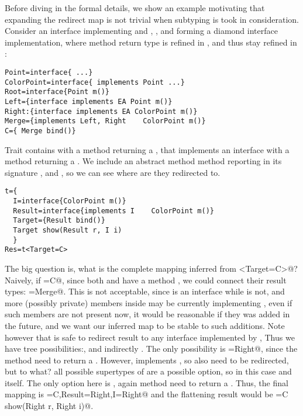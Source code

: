 Before diving in the formal details, we show an example motivating 
that expanding the redirect map is not trivial when subtyping is took in consideration.
Consider an interface \Q@ColorPoint@ implementing \Q@Point@
and \Q@Root@, \Q@Left@, \Q@Right@ and \Q@Merge@
forming a diamond interface implementation, where method 
\Q@m@ return type is refined in \Q@Right@, and thus stay refined in
\Q@Merge@:
\begin{lstlisting}
Point=interface{ ...}
ColorPoint=interface{ implements Point ...}
Root=interface{Point m()}
Left={interface implements EA Point m()}
Right:{interface implements EA ColorPoint m()}
Merge={implements Left, Right    ColorPoint m()}
C={ Merge bind()}
\end{lstlisting}
Trait \Q@t@ contains
 \Q@Target@ with a method returning a \Q@Result@,
that implements an interface \Q@I@ with a method returning a 
\Q@ColorPoint@.
We include an abstract method method 
\Q@show@ reporting in its signature 
\Q@Target@, \Q@Result@ and \Q@I@, so we can see where are they
redirected to.
\begin{lstlisting}
t={
  I=interface{ColorPoint m()}
  Result=interface{implements I    ColorPoint m()}
  Target={Result bind()}
  Target show(Result r, I i)
  }
Res=t<Target=C>
\end{lstlisting}
The big question is, what is the complete mapping inferred
from \Q@t<Target=C>@?
Naively, if \Q@Target=C@, since both \Q@Target@ and \Q@C@
have a method \Q@bind@, we could connect their result types: \Q@Result=Merge@.
This is not acceptable, since \Q@Result@ is an interface while \Q@Merge@ is not, and more (possibly private)
members inside \Q@t@ may be currently implementing \Q@Result@, even if such members are not present now,
it would be reasonable if they was added in the future, and we want our inferred map to be stable to such
additions. Note however that is safe to redirect result to any interface implemented by \Q@Merge@,
Thus we have tree possibilities:\Q@Left@, \Q@Right@ and indirectly \Q@Root@.
The only possibility is \Q@Result=Right@, since the method \Q@m@ need to
return a \Q@ColorPoint@.
However, \Q@Result@ implements \Q@I@, so also \Q@I@ need to be redirected, but to what?
all possible supertypes of \Q@Right@ are a possible option, so in this case \Q@Root@ and \Q@Right@ itself.
The only option here is \Q@Right@, again method \Q@m@ need to
return a \Q@ColorPoint@.
Thus, the final mapping is \Q@Target=C,Result=Right,I=Right@ and the flattening result would be
\Q@Res={C show(Right r, Right i)}@.

